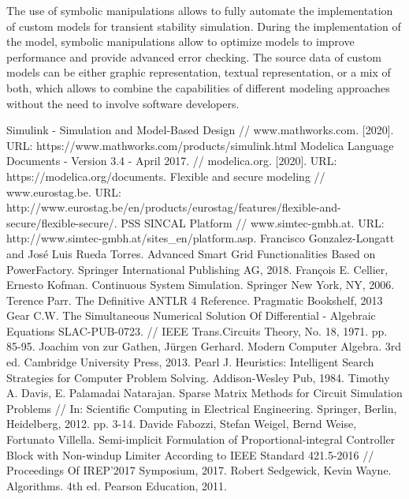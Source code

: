\documentclass[lettersize,journal]{IEEEtran}
\begin{document}
The use of symbolic manipulations allows to fully automate the implementation of custom models for transient stability simulation. 
During the implementation of the model, symbolic manipulations allow to optimize models to improve performance and provide advanced error checking. 
The source data of custom models can be either graphic representation, textual representation, or a mix of both, which allows to combine the capabilities of different modeling
approaches without the need to involve software developers.

\begin{thebibliography}{1}

Simulink - Simulation and Model-Based Design // www.mathworks.com. [2020]. URL: https://www.mathworks.com/products/simulink.html
Modelica Language Documents - Version 3.4 - April 2017. // modelica.org. [2020]. URL: https://modelica.org/documents. 
Flexible and secure modeling // www.eurostag.be. URL: http://www.eurostag.be/en/products/eurostag/features/flexible-and-secure/flexible-secure/.
PSS SINCAL Platform // www.simtec-gmbh.at. URL: http://www.simtec-gmbh.at/sites\_en/platform.asp.
Francisco Gonzalez-Longatt and Jos{\'{e}} Luis Rueda Torres. Advanced Smart Grid Functionalities Based on PowerFactory. Springer International Publishing AG, 2018.
François E. Cellier, Ernesto Kofman. Continuous System Simulation. Springer New York, NY, 2006.
Terence Parr. The Definitive ANTLR 4 Reference. Pragmatic Bookshelf, 2013
Gear C.W. The Simultaneous Numerical Solution Of Differential - Algebraic Equations SLAC-PUB-0723. // IEEE Trans.Circuits Theory, No. 18, 1971. pp. 85-95.
Joachim von zur Gathen, Jürgen Gerhard. Modern Computer Algebra. 3rd ed. Cambridge University Press, 2013.
Pearl J. Heuristics: Intelligent Search Strategies for Computer Problem Solving. Addison-Wesley Pub, 1984.
Timothy A. Davis, E. Palamadai Natarajan. Sparse Matrix Methods for Circuit Simulation Problems // In: Scientific Computing in Electrical Engineering. Springer, Berlin, Heidelberg, 2012. pp. 3-14.
Davide Fabozzi, Stefan Weigel, Bernd Weise, Fortunato Villella. Semi-implicit Formulation of Proportional-integral Controller Block with Non-windup Limiter According to IEEE Standard 421.5-2016 // Proceedings Of IREP'2017 Symposium, 2017.
Robert Sedgewick, Kevin Wayne.  Algorithms. 4th ed. Pearson Education, 2011.
\end{thebibliography}
\end{document}
